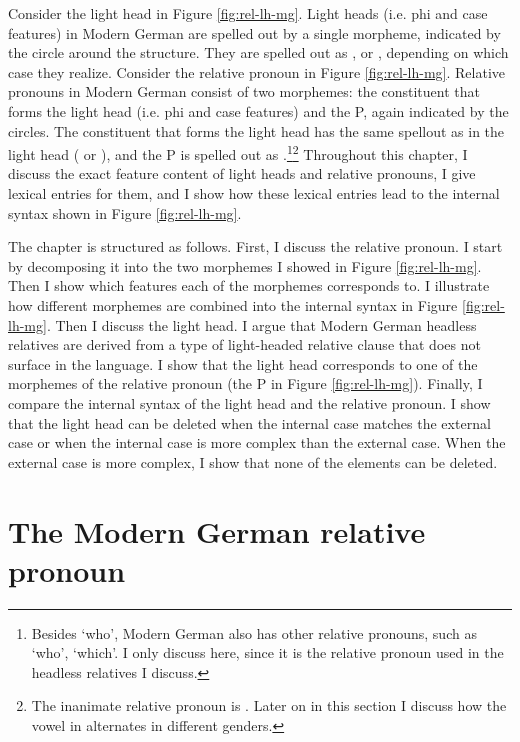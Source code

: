 Consider the light head in Figure \ref{fig:rel-lh-mg}.
Light heads (i.e. phi and case features) in Modern German are spelled out by a single morpheme, indicated by the circle around the structure. They are spelled out as ,  or , depending on which case they realize.
Consider the relative pronoun in Figure \ref{fig:rel-lh-mg}.
Relative pronouns in Modern German consist of two morphemes: the constituent that forms the light head (i.e. phi and case features) and the P, again indicated by the circles. The constituent that forms the light head has the same spellout as in the light head ( or ), and the P is spelled out as .\footnote{
Besides  `who', Modern German also has other relative pronouns, such as  `who',  `which'. I only discuss  here, since it is the relative pronoun used in the headless relatives I discuss.
}\footnote{
The inanimate relative pronoun is . Later on in this section I discuss how the vowel in  alternates in different genders.
}
Throughout this chapter, I discuss the exact feature content of light heads and relative pronouns, I give lexical entries for them, and I show how these lexical entries lead to the internal syntax shown in Figure \ref{fig:rel-lh-mg}.

The chapter is structured as follows.
First, I discuss the relative pronoun. I start by decomposing it into the two morphemes I showed in Figure \ref{fig:rel-lh-mg}. Then I show which features each of the morphemes corresponds to. I illustrate how different morphemes are combined into the internal syntax in Figure \ref{fig:rel-lh-mg}.
Then I discuss the light head. I argue that Modern German headless relatives are derived from a type of light-headed relative clause that does not surface in the language. I show that the light head corresponds to one of the morphemes of the relative pronoun (the P in Figure \ref{fig:rel-lh-mg}).
Finally, I compare the internal syntax of the light head and the relative pronoun. I show that the light head can be deleted when the internal case matches the external case or when the internal case is more complex than the external case. When the external case is more complex, I show that none of the elements can be deleted.


\section{The Modern German relative pronoun}\label{sec:mg-rel}

